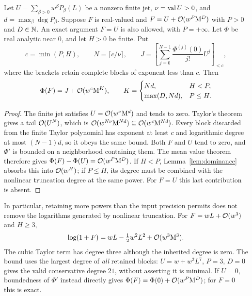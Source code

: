 \begin{lemma}
\label{lem:unit-boundary-degree}
Let $U=\sum_{\beta>0}w^\beta P_\beta(L)$ be a nonzero finite jet,
$\nu=\operatorname{val} U>0$, and $d=\max_\beta\deg P_\beta$. Suppose $F$ is
real-valued and $F=U+\mathcal O(w^P\mathrm M^D)$ with $P>0$ and $D\in\mathbb N$. An exact argument $F=U$
is also allowed, with $P=+\infty$. Let $\Phi$ be real analytic near
$0$, and let $H>0$ be finite. Put
\[
 c=\min(P,H),\qquad N=\lceil c/\nu\rceil,\qquad
 J=\left[\sum_{j=0}^{N-1}\frac{\Phi^{(j)}(0)}{j!}U^j\right]_{<c},
\]
where the brackets retain complete blocks of exponent less than $c$.
Then
\begin{equation}
 \Phi(F)=J+\mathcal O(w^c\mathrm M^K),\qquad
 K=\begin{cases}
 Nd,&H<P,\\
 \max(D,Nd),&P\le H.
 \end{cases}
 \label{eq:unit-boundary-degree}
\end{equation}
\end{lemma}
\begin{proof}
The finite jet satisfies $U=\mathcal O(w^\nu\mathrm M^d)$ and tends to zero.
Taylor's theorem gives a tail $\mathcal O(U^N)$, which is
$\mathcal O(w^{N\nu}\mathrm M^{Nd})\subseteq\mathcal O(w^c\mathrm M^{Nd})$.
Every block discarded from the finite Taylor polynomial has exponent
at least $c$ and logarithmic degree at most $(N-1)d$, so it obeys the
same bound. Both $F$ and $U$ tend to zero, and $\Phi'$ is bounded on
a neighborhood containing them. The mean value theorem therefore gives
$\Phi(F)-\Phi(U)=\mathcal O(w^P\mathrm M^D)$. If $H<P$, Lemma~\ref{lem:dominance}
absorbs this into $\mathcal O(w^H)$; if $P\le H$, its degree must be combined
with the nonlinear truncation degree at the same power. For $F=U$ this
last contribution is absent.
\end{proof}

In particular, retaining more powers than the input precision permits
does not remove the logarithms generated by nonlinear truncation. For
$F=wL+\mathcal O(w^3)$ and $H\ge3$,
\[
 \log(1+F)=wL-\tfrac12w^2L^2+\mathcal O(w^3\mathrm M^3).
\]
The cubic Taylor term has degree three although the inherited degree is
zero. The bound uses the largest degree of \emph{all} retained blocks:
$U=w+w^2L^7$, $P=3$, $D=0$ gives the valid conservative degree $21$,
without asserting it is minimal. If $U=0$, boundedness of $\Phi'$ instead
directly gives $\Phi(F)=\Phi(0)+\mathcal O(w^P\mathrm M^D)$; for $F=0$ this is exact.

